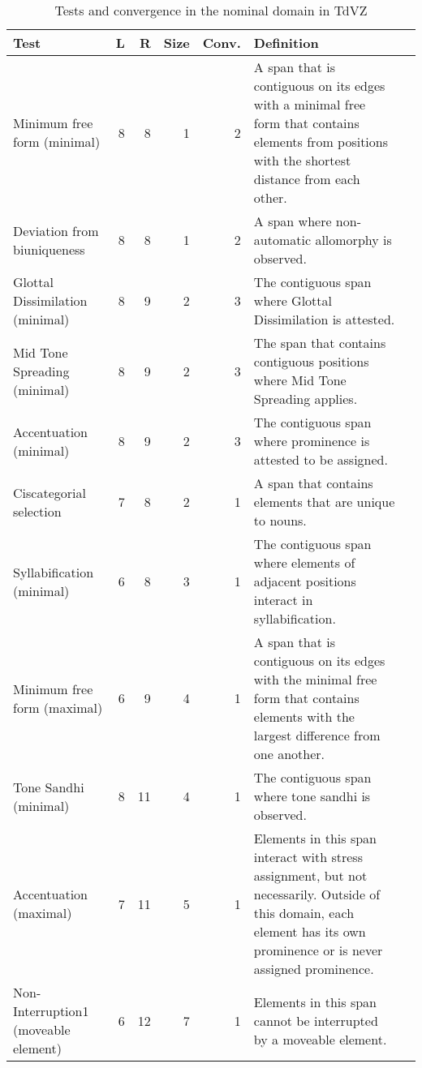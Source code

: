 \documentclass[output=paper]{langscibook}
\begin{document}
\begin{longtable}{p{2.5cm}rrrrp{5.5cm}c}
    \caption{Tests and convergence in the nominal domain in TdVZ} \\ 
    \endfirsthead
    \lsptoprule
Test & L & R & Size & Conv. & Definition\\ \midrule
\raggedright Minimum free form (minimal) & 8 & 8 & 1 & 2           & \raggedright A span that is contiguous on its edges with a minimal free form that contains elements from positions with the shortest distance from each other. &\\
\raggedright Deviation from biuniqueness & 8 & 8 & 1 & 2           & \raggedright A span where non-automatic allomorphy is observed.&\\
\raggedright Glottal Dissimilation (minimal) & 8 & 9 & 2 & 3       & \raggedright The contiguous span where Glottal Dissimilation is attested.&\\
\raggedright Mid Tone Spreading (minimal) & 8 & 9 & 2 & 3          & \raggedright The span that contains contiguous positions where Mid Tone Spreading applies.&\\
\raggedright Accentuation (minimal) & 8 & 9 & 2 & 3                & \raggedright The contiguous span where prominence is attested to be assigned.&\\
\raggedright Ciscategorial selection & 7 & 8 & 2 & 1               & \raggedright A span that contains elements that are unique to nouns.&\\
\raggedright Syllabification (minimal) & 6 & 8 & 3 & 1             & \raggedright The contiguous span where elements of adjacent positions interact in syllabification.&\\
\raggedright Minimum free form (maximal) & 6 & 9 & 4 & 1           & \raggedright A span that is contiguous on its edges with the minimal free form that contains elements with the largest difference from one another.&\\
\raggedright Tone Sandhi (minimal) & 8 & 11 & 4 & 1                & \raggedright The contiguous span where tone sandhi is observed.&\\
\raggedright Accentuation (maximal) & 7 & 11 & 5 & 1               & \raggedright Elements in this span interact with stress assignment, but not necessarily. Outside of this domain, each element has its own prominence or is never assigned prominence. &\\
\raggedright Non-Interruption1 (moveable element) & 6 & 12 & 7 & 1 & \raggedright Elements in this span cannot be interrupted by a moveable element.&\\

\end{longtable}
\end{document}
